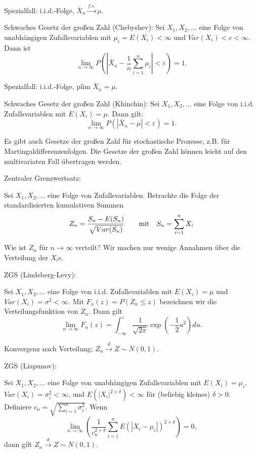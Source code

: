 \documentclass{article}
\begin{document}
Spezialfall: i.i.d.-Folge, $\bar{X}_{n}\overset{f.s.}{\rightarrow }\mu$.

Schwaches Gesetz der großen Zahl (Chebyshev):
Sei $X_{1},X_{2},\ldots $ eine Folge von unabhängigen Zufallsvariablen
mit $\mu _{i}=E(X_{i})<\infty $ und $Var(X_{i})<c<\infty $. Dann ist
\[ \lim_{n\rightarrow \infty }P\left( \left\vert \bar{X}_{n}-\frac{1}{n}%
\sum_{i=1}^{n}\mu _{i}\right\vert <\varepsilon \right) =1. \]

Spezialfall: i.i.d.-Folge, $\textrm{plim }\bar{X}_{n}=\mu $.

Schwaches Gesetz der großen Zahl (Khinchin):
Sei $X_{1},X_{2},\ldots $ eine Folge von i.i.d. Zufallsvariablen mit 
$E(X_{i})=\mu$. Dann gilt:
\[ \lim_{n\rightarrow \infty }P\left( \left\vert \bar{X}_{n}-\mu \right\vert
<\varepsilon \right) =1 .\]

Es gibt auch Gesetze der großen Zahl für stochastische Prozesse, 
z.B. für Martingaldifferenzenfolgen. Die Gesetze der großen Zahl
können leicht auf den multivariaten Fall übertragen werden.


Zentraler Grenzwertsatz:

Sei $X_{1},X_{2},\ldots $ eine Folge von Zufallsvariablen.
Betrachte die Folge der standardisierten kumulativen Summen
\[ Z_{n}=\frac{S_{n}-E(S_{n})}{\sqrt{Var(S_{n})}}\qquad \text{mit\quad }
S_{n}=\sum_{i=1}^{n}X_{i} \]

Wie ist $Z_{n}$ für $n\rightarrow \infty $ verteilt?
Wir machen nur wenige Annahmen über die Verteilung der $X_{i}$s.

ZGS (Lindeberg-Levy):

Sei $X_{1},X_{2},\ldots $ eine Folge von i.i.d. Zufallsvariablen mit
$E(X_{i})=\mu$ und $Var(X_{i})=\sigma ^{2}<\infty $. Mit
$F_{n}(z)=P(Z_{n}\leq z)$ bezeichnen wir die Verteilungsfunktion
von $Z_{n}$. Dann gilt
\[ \lim_{n\rightarrow \infty }F_{n}(z)=\int_{-\infty }^{z}\frac{1}{\sqrt{2\pi }}%
\exp \left( -\frac{1}{2}u^{2}\right) du. \]

Konvergenz nach Verteilung: $Z_{n}\overset{d}{\rightarrow }Z\sim N(0,1)$.

ZGS (Liapunov):

Sei $X_{1},X_{2},\ldots $ eine Folge von unabhängigen Zufallsvariablen
mit $E(X_{i})=\mu _{i}$, $Var(X_{i})=\sigma _{i}^{2}<\infty $,
und $E(|X_{i}|^{2+\delta })<\infty $ für (beliebig kleines) $\delta >0$.
Definiere $c_{n}=\sqrt{\sum_{i=1}^{n}\sigma _{i}^{2}}$. Wenn
\[ \lim_{n\rightarrow \infty }\left( \frac{1}{c_{n}^{2+\delta }}%
\sum_{i=1}^{n}E\left( |X_{i}-\mu _{i}|\right) ^{2+\delta }\right) =0, \]
dann gilt $Z_{n}\overset{d}{\rightarrow }Z\sim N(0,1)$.
\end{document}

